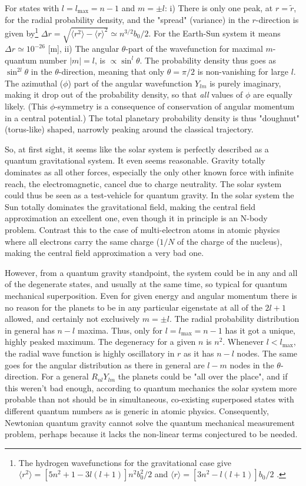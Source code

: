 	For states with $l = l_{\max} = n-1$ and $m = \pm l$: i) There is only one peak, at $r = \tilde{r}$, for the radial probability density, and the "spread" (variance) in the $r$-direction is given by\footnote{The hydrogen wavefunctions for the gravitational case give $\langle r^2 \rangle = [5n^2 + 1 -3l(l+1)] n^2 b_0^2 /2$ and $\langle r \rangle = [3n^2 - l(l+1)]b_0 /2$ .} $\Delta r =\sqrt{\langle r^2 \rangle - \langle r \rangle^2} \simeq n^{3/2}	b_0 /2$. For the Earth-Sun system it means $\Delta r \simeq 10^{-26}$ [m], ii) The angular $\theta$-part of the wavefunction for maximal $m$-quantum number $|m| = l$, is $\propto \sin^{l}\theta$. The probability density thus goes as $\sin^{2l} \theta$ in the $\theta$-direction, meaning that only $\theta = \pi /2$ is non-vanishing for large $l$. The azimuthal ($\phi$) part of the angular wavefunction $Y_{lm}$ is purely imaginary, making it drop out of the probability density, so that \textit{all} values of $\phi$ are equally likely. (This $\phi$-symmetry is a consequence	of conservation of angular momentum in a central potential.) The total planetary probability density is thus "doughnut" (torus-like) shaped, narrowly peaking around the classical trajectory.
	
	So, at first sight, it seems like the solar system is perfectly described as a quantum gravitational system. It even seems reasonable. Gravity totally dominates as all other forces, especially the only other known force with infinite reach, the electromagnetic, cancel due to charge neutrality. The solar system could thus be seen as a test-vehicle for quantum gravity. In the	solar system the Sun totally dominates the gravitational field, making the central field approximation an excellent one, even though it in principle is an N-body problem. Contrast this to the case of multi-electron atoms in atomic physics where all electrons	carry the same charge ($1/N$ of the charge of the nucleus), making the central field approximation a very bad one.
	
	However, from a quantum gravity standpoint, the system could be in any and all of the degenerate states, and usually at the same time, so typical for quantum mechanical superposition. Even for given energy and angular momentum there is no reason for the planets to be in any particular eigenstate at all of the $2l +1$	allowed, and certainly not exclusively $m = \pm l$. The radial	probability distribution in general has $n-l$ maxima. Thus, only for $l = l_{\max} = n-1$ has it got a unique, highly peaked maximum. The degeneracy for a given $n$ is $n^2$. Whenever $l < l_{\max}$, the radial wave function is highly oscillatory in $r$ as it has $n-l$ nodes. The same goes for the angular distribution as there in general are $l-m$ nodes in the $\theta$-direction. For a general $R_{nl} Y_{lm}$ the planets could be "all over the place", and if this weren't bad enough, according to quantum mechanics the solar system more probable than not should be in simultaneous, co-existing superposed states with different quantum numbers as is generic in atomic physics. Consequently, Newtonian quantum gravity cannot solve the quantum mechanical measurement problem, perhaps because it lacks the non-linear terms conjectured to be needed.
	
